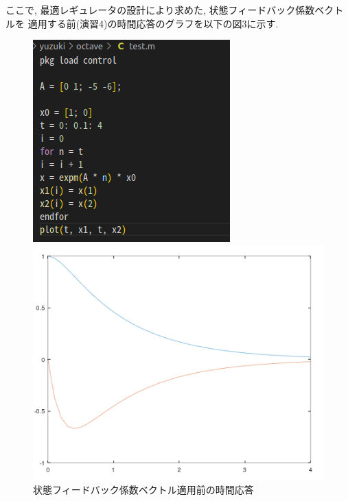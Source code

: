 \documentclass{jsarticle}
\begin{document}
\vspace*{2mm}
ここで, 最適レギュレータの設計により求めた, 状態フィードバック係数ベクトルを
適用する前(演習4)の\hspace*{1zw}時間応答のグラフを以下の図3に示す.\\

\begin{figure}[htbp]
  \begin{minipage}[t]{0.5\linewidth}
    \centering
    \includegraphics[keepaspectratio, scale=0.605]{fig/moto_c.png}
  \end{minipage}
  \begin{minipage}[t]{0.5\linewidth}
    \centering
    \includegraphics[keepaspectratio, scale=0.48]{fig/moto_r.png}
  \end{minipage}\vspace*{2mm}
  \caption{状態フィードバック係数ベクトル適用前の時間応答}
\end{figure}
\end{document}
